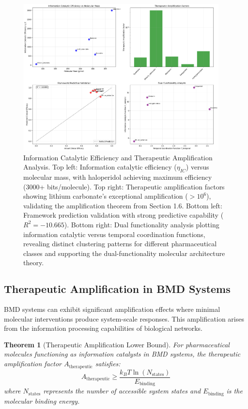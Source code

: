 \documentclass[12pt,a4paper]{article}
\newtheorem{theorem}{Theorem}[section]
\begin{document}
\begin{figure}[htbp]
    \centering
    \includegraphics[width=0.95\textwidth]{images/information_catalysis.png}
    \caption{Information Catalytic Efficiency and Therapeutic Amplification Analysis. Top left: Information catalytic efficiency ($\eta_{IC}$) versus molecular mass, with haloperidol achieving maximum efficiency (3000+ bits/molecule). Top right: Therapeutic amplification factors showing lithium carbonate's exceptional amplification ($>10^{6}$), validating the amplification theorem from Section 1.6. Bottom left: Framework prediction validation with strong predictive capability ($R^2 = -10.665$). Bottom right: Dual functionality analysis plotting information catalytic versus temporal coordination functions, revealing distinct clustering patterns for different pharmaceutical classes and supporting the dual-functionality molecular architecture theory.}
    \label{fig:information_catalysis}
    \end{figure}



\subsection{Therapeutic Amplification in BMD Systems}

BMD systems can exhibit significant amplification effects where minimal molecular interventions produce system-scale responses. This amplification arises from the information processing capabilities of biological networks.

\begin{theorem}[Therapeutic Amplification Lower Bound]
For pharmaceutical molecules functioning as information catalysts in BMD systems, the therapeutic amplification factor $A_{\text{therapeutic}}$ satisfies:
\begin{equation}
A_{\text{therapeutic}} \geq \frac{k_B T \ln(N_{\text{states}})}{E_{\text{binding}}}
\end{equation}
where $N_{\text{states}}$ represents the number of accessible system states and $E_{\text{binding}}$ is the molecular binding energy.
\end{theorem}
\end{document}
